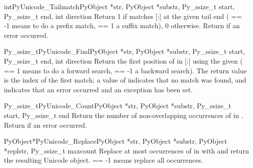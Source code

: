 \begin{cfuncdesc}{int}{PyUnicode_Tailmatch}{PyObject *str,
                                                  PyObject *substr,
                                                  Py_ssize_t start,
                                                  Py_ssize_t end,
                                                  int direction}
  Return 1 if  matches [:] at
  the given tail end ( == -1 means to do a prefix
  match,  == 1 a suffix match), 0 otherwise.
  Return  if an error occurred.
\end{cfuncdesc}

\begin{cfuncdesc}{Py_ssize_t}{PyUnicode_Find}{PyObject *str,
                                       PyObject *substr,
                                       Py_ssize_t start,
                                       Py_ssize_t end,
                                       int direction}
  Return the first position of  in
  [:] using the given 
  ( == 1 means to do a forward search,
   == -1 a backward search).  The return value is the
  index of the first match; a value of  indicates that no
  match was found, and  indicates that an error occurred and
  an exception has been set.
\end{cfuncdesc}

\begin{cfuncdesc}{Py_ssize_t}{PyUnicode_Count}{PyObject *str,
                                        PyObject *substr,
                                        Py_ssize_t start,
                                        Py_ssize_t end}
  Return the number of non-overlapping occurrences of  in
  .  Return  if an
  error occurred.
\end{cfuncdesc}

\begin{cfuncdesc}{PyObject*}{PyUnicode_Replace}{PyObject *str,
                                                PyObject *substr,
                                                PyObject *replstr,
                                                Py_ssize_t maxcount}
  Replace at most  occurrences of  in
   with  and return the resulting Unicode object.
   == -1 means replace all occurrences.
\end{cfuncdesc}

